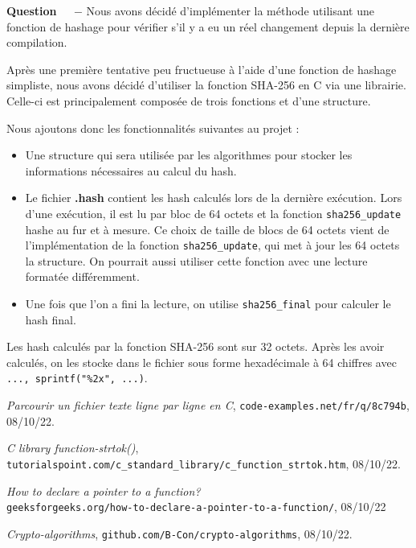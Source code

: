 \documentclass[11pt]{article}
\newcounter{question}[section]
\newenvironment{question}[1][]{\refstepcounter{question}\par\medskip
   \noindent\textbf{Question~\thequestion ~ $-$} \rmfamily}{}
\begin{document}
\begin{question} %
Nous avons décidé d'implémenter la méthode utilisant une fonction de hashage pour vérifier s'il y a eu un réel changement depuis la dernière compilation.

	Après une première tentative peu fructueuse à l'aide d'une fonction de hashage simpliste, nous avons décidé d'utiliser
	la fonction SHA-256 en C\cite{hash} via une librairie. Celle-ci est principalement composée de trois fonctions et d'une structure.
	
Nous ajoutons donc les fonctionnalités suivantes au projet :

	\begin{itemize}
		\item Une structure qui sera utilisée par les algorithmes pour stocker les informations nécessaires au calcul du hash.
		\item Le fichier \textbf{.hash} contient les hash calculés lors de la dernière exécution. Lors d'une exécution, il est lu par bloc de 64 octets et la fonction \texttt{sha256\_update} hashe au fur et à mesure.
		Ce choix de taille de blocs de 64 octets vient de l'implémentation de la fonction \texttt{sha256\_update}, qui met à jour les 64 octets la structure. On pourrait aussi utiliser cette fonction avec une lecture formatée différemment.
		\item Une fois que l'on a fini la lecture, on utilise \texttt{sha256\_final} pour calculer le hash final.
	\end{itemize}

	Les hash calculés par la fonction SHA-256 sont sur 32 octets. Après les avoir calculés, on les stocke dans le fichier sous forme hexadécimale à 64 chiffres avec \texttt{..., sprintf("\%2x", ...)}.

\end{question}


\newpage

\begin{thebibliography}{99}
  \textit{Parcourir un fichier texte ligne par ligne en C},
  \texttt{code-examples.net/fr/q/8c794b},
  08/10/22.

  \textit{C library function-strtok()},
  \texttt{\\tutorialspoint.com/c\_standard\_library/c\_function\_strtok.htm},
  08/10/22.

  \textit{How to declare a pointer to a function?}
  \texttt{\\geeksforgeeks.org/how-to-declare-a-pointer-to-a-function/}, 
  08/10/22
  
  \textit{Crypto-algorithms},
  \texttt{github.com/B-Con/crypto-algorithms},
  08/10/22.


\end{thebibliography}
\end{document}
